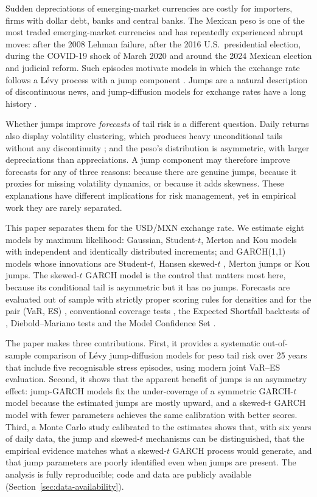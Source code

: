 \documentclass[11pt]{article}
\begin{document}
Sudden depreciations of emerging-market currencies are costly for importers, firms with dollar debt, banks and central banks. The Mexican peso is one of the most traded emerging-market currencies and has repeatedly experienced abrupt moves: after the 2008 Lehman failure, after the 2016 U.S.\ presidential election, during the COVID-19 shock of March 2020 and around the 2024 Mexican election and judicial reform. Such episodes motivate models in which the exchange rate follows a Lévy process with a jump component \citep{merton1976,kou2002,conttankov2004}. Jumps are a natural description of discontinuous news, and jump-diffusion models for exchange rates have a long history \citep{jorion1988,bates1996}.

Whether jumps improve \emph{forecasts} of tail risk is a different question. Daily returns also display volatility clustering, which produces heavy unconditional tails without any discontinuity \citep{engle1982,bollerslev1986}; and the peso's distribution is asymmetric, with larger depreciations than appreciations. A jump component may therefore improve forecasts for any of three reasons: because there are genuine jumps, because it proxies for missing volatility dynamics, or because it adds skewness. These explanations have different implications for risk management, yet in empirical work they are rarely separated.

This paper separates them for the USD/MXN exchange rate. We estimate eight models by maximum likelihood: Gaussian, Student-$t$, Merton and Kou models with independent and identically distributed increments; and GARCH(1,1) models whose innovations are Student-$t$, Hansen skewed-$t$ \citep{hansen1994}, Merton jumps or Kou jumps. The skewed-$t$ GARCH model is the control that matters most here, because its conditional tail is asymmetric but it has no jumps. Forecasts are evaluated out of sample with strictly proper scoring rules for densities \citep{gneitingraftery2007} and for the pair (VaR, ES) \citep{fisslerziegel2016,pattonziegelchen2019}, conventional coverage tests \citep{kupiec1995,christoffersen1998}, the Expected Shortfall backtests of \citet{duescanciano2017}, Diebold--Mariano tests \citep{dieboldmariano1995} and the Model Confidence Set \citep{hansenlundenason2011}.

The paper makes three contributions. First, it provides a systematic out-of-sample comparison of Lévy jump-diffusion models for peso tail risk over 25 years that include five recognisable stress episodes, using modern joint VaR--ES evaluation. Second, it shows that the apparent benefit of jumps is an asymmetry effect: jump-GARCH models fix the under-coverage of a symmetric GARCH-$t$ model because the estimated jumps are mostly upward, and a skewed-$t$ GARCH model with fewer parameters achieves the same calibration with better scores. Third, a Monte Carlo study calibrated to the estimates shows that, with six years of daily data, the jump and skewed-$t$ mechanisms can be distinguished, that the empirical evidence matches what a skewed-$t$ GARCH process would generate, and that jump parameters are poorly identified even when jumps are present. The analysis is fully reproducible; code and data are publicly available (Section~\ref{sec:data-availability}).
\end{document}
